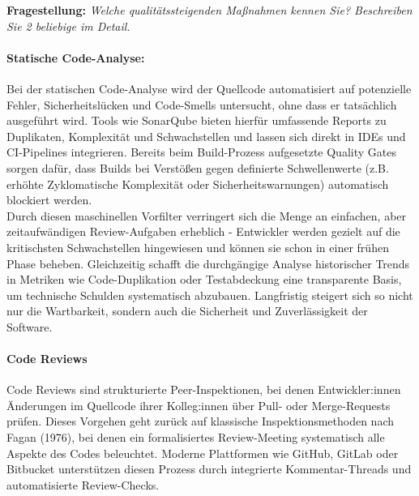 \textbf{Fragestellung:} \textit{Welche qualitätssteigenden Maßnahmen kennen Sie? Beschreiben Sie 2 beliebige im Detail.}    

\paragraph{Statische Code-Analyse:}
Bei der statischen Code-Analyse wird der Quellcode automatisiert auf potenzielle Fehler, Sicherheitslücken und Code-Smells untersucht, ohne dass er tatsächlich ausgeführt wird. 
Tools wie SonarQube bieten hierfür umfassende Reports zu Duplikaten, Komplexität und Schwachstellen und lassen sich direkt in IDEs und CI-Pipelines integrieren.\cite{sonarqube-docs-2023,ayewah2008using}
Bereits beim Build-Prozess aufgesetzte Quality Gates sorgen dafür, dass Builds bei Verstößen gegen definierte Schwellenwerte (z.B. erhöhte Zyklomatische Komplexität oder Sicherheitswarnungen) automatisch blockiert werden. \cite{beller2016static} \\

Durch diesen maschinellen Vorfilter verringert sich die Menge an einfachen, 
aber zeitaufwändigen Review-Aufgaben erheblich - Entwickler werden gezielt auf die kritischsten Schwachstellen hingewiesen und können sie schon in einer frühen Phase beheben.\cite{ayewah2008using}
Gleichzeitig schafft die durchgängige Analyse historischer Trends in Metriken wie Code-Duplikation oder Testabdeckung eine transparente Basis, um technische Schulden systematisch abzubauen. 
Langfristig steigert sich so nicht nur die Wartbarkeit, sondern auch die Sicherheit und Zuverlässigkeit der Software. \cite{sonarqube-docs-2023}
\paragraph{Code Reviews}
Code Reviews sind strukturierte Peer-Inspektionen, bei denen Entwickler:innen Änderungen im Quellcode ihrer Kolleg:innen über Pull- oder Merge-Requests prüfen. 
Dieses Vorgehen geht zurück auf klassische Inspektionsmethoden nach Fagan (1976), bei denen ein formalisiertes Review-Meeting systematisch alle Aspekte des Codes beleuchtet.\cite{fagan1976design}
Moderne Plattformen wie GitHub, GitLab oder Bitbucket unterstützen diesen Prozess durch integrierte Kommentar-Threads und automatisierte Review-Checks. \cite{atlassian2024code,cohen2010business} \\

